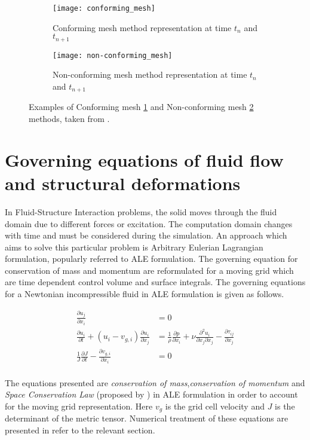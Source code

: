 \begin{figure}[h]
  \centering
  \begin{subfigure}[b]{0.45\linewidth}
    \texttt{[image: conforming\_mesh]}
    \caption{Conforming mesh method representation at time $ t_{n} $ and $t_{n+1}$}
    \label{fig:2.5a} 
  \end{subfigure}
  \begin{subfigure}[b]{0.45\linewidth}
    \texttt{[image: non-conforming\_mesh]}
    \caption{Non-conforming mesh method representation at time $ t_{n} $ and $t_{n+1}$}
    \label{fig:2.5b}  
  \end{subfigure}
  \caption{Examples of Conforming mesh \ref{fig:2.5a} and Non-conforming mesh \ref{fig:2.5b} methods, taken from \citet{hou2012numerical}.}
  \label{fig:2.5}
\end{figure} 

\section{Governing equations of fluid flow and structural deformations}

In Fluid-Structure Interaction problems, the solid moves through the fluid domain due to different forces or excitation. The computation domain changes with time and must be considered during the simulation. An approach which aims to solve this particular problem is Arbitrary Eulerian Lagrangian formulation, popularly referred to ALE formulation. The governing equation for conservation of mass and momentum are reformulated for a moving grid which are time dependent control volume and surface integrals. The governing equations for a Newtonian incompressible fluid in ALE formulation is given as follows.

\begin{align}
 \frac{\partial{u_{j}}}{\partial{x_{i}}} & = 0\\
 \frac{\partial{u_{i}}}{\partial{t}}+\left(u_{i}-v_{g,i}\right)\frac{\partial{u_{i}}}{\partial{x_{j}}} &= \frac{1}{\rho}\frac{\partial{p}}{\partial{x_{i}}}+\nu\frac{\partial^2{u_{i}}}{\partial{x_{j}}\partial{x_{j}}}-\frac{\partial{\tau_{ij}}}{\partial{x_{j}}}\\
 \frac{1}{J}\frac{\partial{J}}{\partial{t}}-\frac{\partial{v_{g,i}}}{\partial{x_{i}}} & = 0
\end{align}\\
The equations presented are \textit{conservation of mass},\textit{conservation of momentum} and \textit{Space Conservation Law} (proposed by \citet{demirdvzic1988space}) in ALE formulation in order to account for the moving grid representation. Here $ v_{g} $ is the grid cell velocity and $J$ is the determinant of the metric tensor. Numerical treatment of these equations are presented in {refer to the relevant section}.

